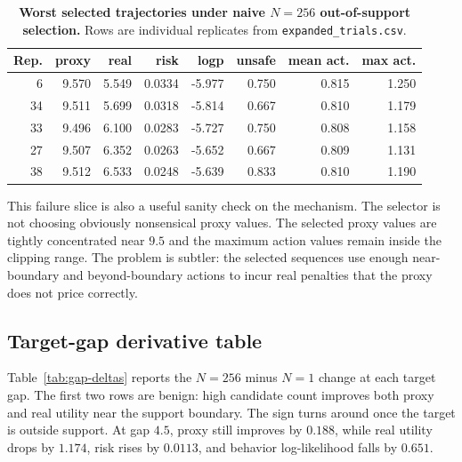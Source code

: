 \begin{table}[t]
\centering
\small
\caption{\textbf{Worst selected trajectories under naive $N=256$ out-of-support selection.} Rows are individual replicates from \texttt{expanded\_trials.csv}.}
\label{tab:worst-reps}
\begin{tabular}{rrrrrrrr}
\toprule
Rep. & proxy & real & risk & logp & unsafe & mean act. & max act. \\
\midrule
6 & 9.570 & 5.549 & 0.0334 & -5.977 & 0.750 & 0.815 & 1.250 \\
34 & 9.511 & 5.699 & 0.0318 & -5.814 & 0.667 & 0.810 & 1.179 \\
33 & 9.496 & 6.100 & 0.0283 & -5.727 & 0.750 & 0.808 & 1.158 \\
27 & 9.507 & 6.352 & 0.0263 & -5.652 & 0.667 & 0.809 & 1.131 \\
38 & 9.512 & 6.533 & 0.0248 & -5.639 & 0.833 & 0.810 & 1.190 \\
\bottomrule
\end{tabular}
\end{table}

This failure slice is also a useful sanity check on the mechanism. The selector is not choosing obviously nonsensical proxy values. The selected proxy values are tightly concentrated near $9.5$ and the maximum action values remain inside the clipping range. The problem is subtler: the selected sequences use enough near-boundary and beyond-boundary actions to incur real penalties that the proxy does not price correctly.

\subsection{Target-gap derivative table}

Table~\ref{tab:gap-deltas} reports the $N=256$ minus $N=1$ change at each target gap. The first two rows are benign: high candidate count improves both proxy and real utility near the support boundary. The sign turns around once the target is outside support. At gap $4.5$, proxy still improves by $0.188$, while real utility drops by $1.174$, risk rises by $0.0113$, and behavior log-likelihood falls by $0.651$.

